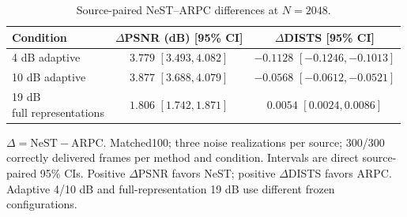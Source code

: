 \begin{table}[t]
\centering
\caption{Source-paired NeST--ARPC differences at $N=2048$.}
\label{tab:n2048-paired}
\begingroup
\fontsize{8.5}{10}\selectfont
\setlength{\tabcolsep}{3pt}
\renewcommand{\arraystretch}{1.15}
\begin{tabular}{@{}lcc@{}}
\toprule
Condition & \shortstack{$\Delta$PSNR (dB)\\[1pt][95\% CI]} & \shortstack{$\Delta$DISTS\\[1pt][95\% CI]} \\
\midrule
4 dB adaptive & \shortstack{$3.779$\\[1pt]$[3.493, 4.082]$} & \shortstack{$-0.1128$\\[1pt]$[-0.1246, -0.1013]$} \\[3pt]
10 dB adaptive & \shortstack{$3.877$\\[1pt]$[3.688, 4.079]$} & \shortstack{$-0.0568$\\[1pt]$[-0.0612, -0.0521]$} \\[3pt]
\shortstack[l]{19 dB\\full representations} & \shortstack{$1.806$\\[1pt]$[1.742, 1.871]$} & \shortstack{$0.0054$\\[1pt]$[0.0024, 0.0086]$} \\[3pt]
\bottomrule
\end{tabular}
\par\vspace{3pt}
\begin{minipage}{\columnwidth}
$\Delta = \mathrm{NeST}-\mathrm{ARPC}$. Matched100; three noise realizations per source; 300/300 correctly delivered frames per method and condition. Intervals are direct source-paired 95\% CIs. Positive $\Delta$PSNR favors NeST; positive $\Delta$DISTS favors ARPC. Adaptive 4/10 dB and full-representation 19 dB use different frozen configurations.
\end{minipage}
\endgroup
\end{table}

